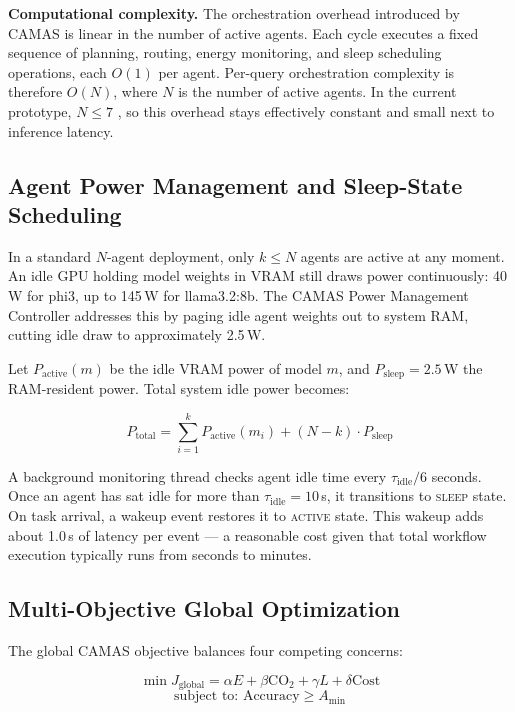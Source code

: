\documentclass[journal]{IEEEtran}
\begin{document}
\textbf{Computational complexity.} The orchestration overhead introduced by
CAMAS is linear in the number of active agents. Each cycle executes a fixed
sequence of planning, routing, energy monitoring, and sleep scheduling
operations, each $O(1)$ per agent. Per-query orchestration complexity is therefore $O(N)$, where $N$ is the number of active agents.
In the current prototype, $N \leq 7$ , so this overhead stays effectively constant and small next to inference latency.

\subsection{Agent Power Management and Sleep-State Scheduling}

In a standard $N$-agent deployment, only $k \leq N$ agents are active at any
moment. An idle GPU holding model weights in VRAM still draws power
continuously: 40\,W for phi3, up to 145\,W for llama3.2:8b. The CAMAS Power
Management Controller addresses this by paging idle agent weights out to
system RAM, cutting idle draw to approximately 2.5\,W.

Let $P_{\text{active}}(m)$ be the idle VRAM power of model $m$, and
$P_{\text{sleep}} = 2.5\,$W the RAM-resident power. Total system idle power
becomes:

\begin{equation}
    P_{\text{total}} = \sum_{i=1}^{k} P_{\text{active}}(m_i) + (N - k) \cdot P_{\text{sleep}}
    \label{eq:power}
\end{equation}

A background monitoring thread checks agent idle time every
$\tau_{\text{idle}}/6$ seconds. Once an agent has sat idle for more than
$\tau_{\text{idle}} = 10$\,s, it transitions to \textsc{sleep} state. On task
arrival, a wakeup event restores it to \textsc{active} state. This wakeup
adds about 1.0\,s of latency per event — a reasonable cost given that total
workflow execution typically runs from seconds to minutes.

\subsection{Multi-Objective Global Optimization}

The global CAMAS objective balances four competing concerns:

\begin{equation}
    \min J_{\text{global}} = \alpha E + \beta \text{CO}_2 + \gamma L + \delta \text{Cost}
    \label{eq:global}
\end{equation}
\begin{equation}
    \text{subject to: Accuracy} \geq A_{\min}
    \label{eq:global_constraint}
\end{equation}
\end{document}
